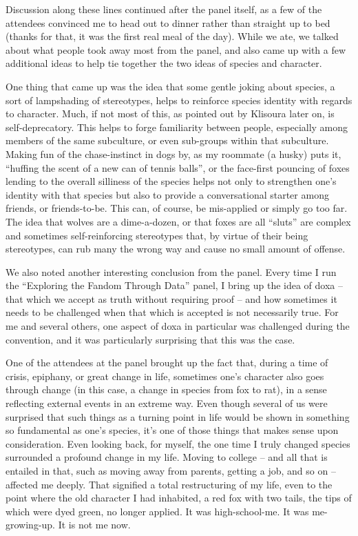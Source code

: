Discussion along these lines continued after the panel itself, as a few of the attendees convinced me to head out to dinner rather than straight up to bed (thanks for that, it was the first real meal of the day). While we ate, we talked about what people took away most from the panel, and also came up with a few additional ideas to help tie together the two ideas of species and character.

One thing that came up was the idea that some gentle joking about species, a sort of lampshading of stereotypes, helps to reinforce species identity with regards to character. Much, if not most of this, as pointed out by Klisoura later on, is self-deprecatory. This helps to forge familiarity between people, especially among members of the same subculture, or even sub-groups within that subculture. Making fun of the chase-instinct in dogs by, as my roommate (a husky) puts it, ``huffing the scent of a new can of tennis balls'', or the face-first pouncing of foxes lending to the overall silliness of the species helps not only to strengthen one's identity with that species but also to provide a conversational starter among friends, or friends-to-be. This can, of course, be mis-applied or simply go too far. The idea that wolves are a dime-a-dozen, or that foxes are all ``sluts'' are complex and sometimes self-reinforcing stereotypes that, by virtue of their being stereotypes, can rub many the wrong way and cause no small amount of offense.

We also noted another interesting conclusion from the panel. Every time I run the ``Exploring the Fandom Through Data'' panel, I bring up the idea of doxa -- that which we accept as truth without requiring proof -- and how sometimes it needs to be challenged when that which is accepted is not necessarily true. For me and several others, one aspect of doxa in particular was challenged during the convention, and it was particularly surprising that this was the case.

One of the attendees at the panel brought up the fact that, during a time of crisis, epiphany, or great change in life, sometimes one's character also goes through change (in this case, a change in species from fox to rat), in a sense reflecting external events in an extreme way. Even though several of us were surprised that such things as a turning point in life would be shown in something so fundamental as one's species, it's one of those things that makes sense upon consideration. Even looking back, for myself, the one time I truly changed species surrounded a profound change in my life. Moving to college -- and all that is entailed in that, such as moving away from parents, getting a job, and so on -- affected me deeply. That signified a total restructuring of my life, even to the point where the old character I had inhabited, a red fox with two tails, the tips of which were dyed green, no longer applied. It was high-school-me. It was me-growing-up. It is not me now.

